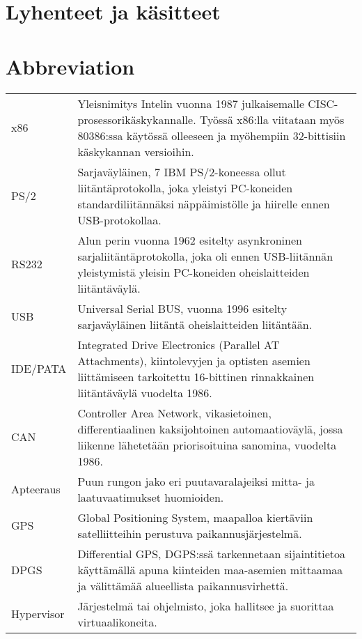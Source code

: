\pagestyle{empty}
\setlength{\parskip}{1cm}
 {
  \chapter*{Lyhenteet ja käsitteet}
} {
  \chapter*{Abbreviation}
}
\begin{table}[h]
\setlength{\tabcolsep}{8pt}
\renewcommand{\arraystretch}{2}
\begin{tabular}{l p{12cm}}
x86 & Yleisnimitys Intelin vuonna 1987 julkaisemalle CISC-prosessorikäskykannalle. Työssä x86:lla viitataan myös 80386:ssa käytössä olleeseen ja myöhempiin 32-bittisiin käskykannan versioihin.\\
PS/2 & Sarjaväyläinen, 7 IBM PS/2-koneessa ollut liitäntäprotokolla, joka yleistyi PC-koneiden standardiliitännäksi näppäimistölle ja hiirelle ennen USB-protokollaa.\\
RS232 & Alun perin vuonna 1962 esitelty asynkroninen sarjaliitäntäprotokolla, joka oli ennen USB-liitännän yleistymistä yleisin PC-koneiden oheislaitteiden liitäntäväylä.\\
USB & Universal Serial BUS, vuonna 1996 esitelty sarjaväyläinen liitäntä oheislaitteiden liitäntään.\\
IDE/PATA & Integrated Drive Electronics (Parallel AT Attachments), kiintolevyjen ja optisten asemien liittämiseen tarkoitettu 16-bittinen rinnakkainen liitäntäväylä vuodelta 1986.\\
CAN & Controller Area Network, vikasietoinen, differentiaalinen kaksijohtoinen automaatioväylä, jossa liikenne lähetetään priorisoituina sanomina, vuodelta 1986.\\
Apteeraus & Puun rungon jako eri puutavaralajeiksi mitta- ja laatuvaatimukset huomioiden.\\
GPS & Global Positioning System, maapalloa kiertäviin satelliitteihin perustuva paikannusjärjestelmä.\\
DPGS & Differential GPS, DGPS:ssä tarkennetaan sijaintitietoa käyttämällä apuna kiinteiden maa-asemien mittaamaa ja välittämää alueellista paikannusvirhettä.\\
Hypervisor & Järjestelmä tai ohjelmisto, joka hallitsee ja suorittaa virtuaalikoneita.\\
%
\end{tabular}
\end{table}

